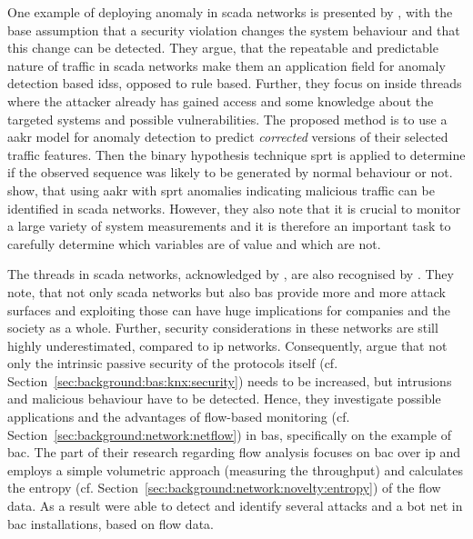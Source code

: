 One example of deploying anomaly in \gls{scada} networks is presented by \textcite{Yang2006}, with the base assumption that a security violation changes the system behaviour and that this change can be detected. They argue, that the repeatable and predictable nature of traffic in \gls{scada} networks make them an application field for anomaly detection based \glspl{ids}, opposed to rule based.
Further, they focus on inside threads where the attacker already has gained access and some knowledge about the targeted systems and possible vulnerabilities.
The proposed method is to use a \gls{aakr} model for anomaly detection to predict \emph{corrected} versions of their selected traffic features. Then the binary hypothesis technique \gls{sprt} is applied to determine if the observed sequence was likely to be generated by normal behaviour or not.
\textcite{Yang2006} show, that using \gls{aakr} with \gls{sprt} anomalies indicating malicious traffic can be identified in \gls{scada} networks.
However, they also note that it is crucial to monitor a large variety of system measurements and it is therefore an important task to carefully determine which variables are of value and which are not.

The threads in \gls{scada} networks, acknowledged by \textcite{Yang2006}, are also recognised by \textcite{Celeda2012}. They note, that not only \gls{scada} networks but also \gls{bas} provide more and more attack surfaces and exploiting those can have huge implications for companies and the society as a whole.
Further, security considerations in these networks are still highly underestimated, compared to \gls{ip} networks.
Consequently, \textcite{Celeda2012} argue that not only the intrinsic passive security of the protocols itself (cf. Section~\ref{sec:background:bas:knx:security}) needs to be increased, but intrusions and malicious behaviour have to be detected. Hence, they investigate possible applications and the advantages of flow-based monitoring (cf. Section~\ref{sec:background:network:netflow}) in \gls{bas}, specifically on the example of \gls{bac}.
The part of their research regarding flow analysis focuses on \gls{bac} over \gls{ip} and employs a simple volumetric approach (measuring the throughput) and calculates the entropy (cf. Section~\ref{sec:background:network:novelty:entropy}) of the flow data.
As a result \textcite{Celeda2012} were able to detect and identify several attacks and a bot net in \gls{bac} installations, based on flow data.

